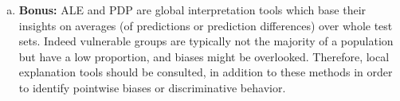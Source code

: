 {\begin{enumerate}[a)]
Overall, the following ordering of \texttt{personal\_status\_sex} was returned by the method: 
% 



The ordering seems to be feasible, since categories including females are close to each other 
and also categories with males. 
Also the ordering of males according to their relationship status seems to make sense, since typically 
the process is: single, then married and then divorced :-).

\item \textbf{Bonus:} ALE and PDP are global interpretation tools which base their insights on averages (of predictions or 
prediction differences) over whole test sets.
Indeed vulnerable groups are typically not the majority of a population but have a low proportion, 
and biases might be overlooked.
Therefore, local explanation tools should be consulted, in addition to these methods in order to 
identify pointwise biases or discriminative behavior.

\end{enumerate}
}